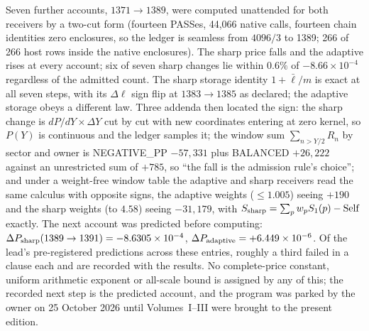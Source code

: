 Seven further accounts, $1371\to1389$, were computed unattended for both receivers by a two-cut form (fourteen PASSes, 44,066 native calls, fourteen chain identities zero enclosures, so the ledger is seamless from $4096/3$ to 1389; 266 of 266 host rows inside the native enclosures). The sharp price falls and the adaptive rises at every account; six of seven sharp changes lie within $0.6\%$ of $-8.66\times10^{-4}$ regardless of the admitted count. The sharp storage identity $1+\bar\ell/m$ is exact at all seven steps, with its $\Delta\ell$ sign flip at $1383\to1385$ as declared; the adaptive storage obeys a different law. Three addenda then located the sign: the sharp change is $dP/dY\times\Delta Y$ cut by cut with new coordinates entering at zero kernel, so $P(Y)$ is continuous and the ledger samples it; the window sum $\sum_{n>Y/2}R_n$ by sector and owner is NEGATIVE\_PP $-57{,}331$ plus BALANCED $+26{,}222$ against an unrestricted sum of $+785$, so ``the fall is the admission rule's choice''; and under a weight-free window table the adaptive and sharp receivers read the same calculus with opposite signs, the adaptive weights ($\le1.005$) seeing $+190$ and the sharp weights (to $4.58$) seeing $-31{,}179$, with $S_{\rm sharp}=\sum_p w_pS_1(p)-{\rm Self}$ exactly. The next account was predicted before computing: $\Delta P_{\rm sharp}(1389\to1391)=-8.6305\times10^{-4}$, $\Delta P_{\rm adaptive}=+6.449\times10^{-6}$. Of the lead's pre-registered predictions across these entries, roughly a third failed in a clause each and are recorded with the results. No complete-price constant, uniform arithmetic exponent or all-scale bound is assigned by any of this; the recorded next step is the predicted account, and the program was parked by the owner on 25 October 2026 until Volumes~I--III were brought to the present edition.

